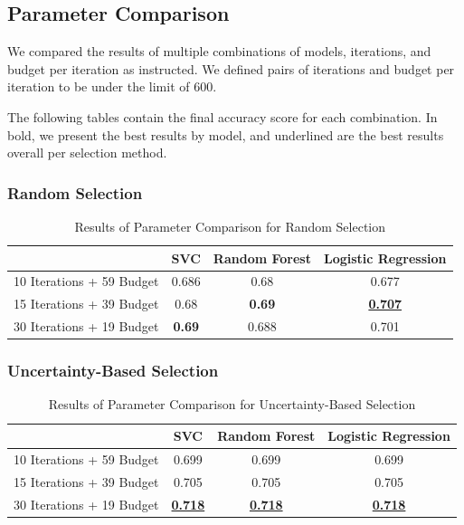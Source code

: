 \documentclass[12pt]{article}
\begin{document}
\subsection{Parameter Comparison}

We compared the results of multiple combinations of models, iterations, and budget per iteration as instructed. We defined pairs of iterations and budget per iteration to be under the limit of 600.

The following tables contain the final accuracy score for each combination. In bold, we present the best results by model, and underlined are the best results overall per selection method.

\subsubsection*{Random Selection}

\begin{table}[H]
    \centering
    \begin{tabular}{|c|c|c|c|}
        \hline
        & SVC & Random Forest & Logistic Regression \\
        \hline
        10 Iterations + 59 Budget & 0.686 & 0.68 & 0.677 \\
        15 Iterations + 39 Budget & 0.68 & \textbf{0.69} & \underline{\textbf{0.707}} \\
        30 Iterations + 19 Budget & \textbf{0.69} & 0.688 & 0.701 \\
        \hline
    \end{tabular}
    \caption{Results of Parameter Comparison for Random Selection}
\end{table}

\subsubsection*{Uncertainty-Based Selection}

\begin{table}[H]
    \centering
    \begin{tabular}{|c|c|c|c|}
        \hline
        & SVC & Random Forest & Logistic Regression \\
        \hline
        10 Iterations + 59 Budget & 0.699 & 0.699 & 0.699 \\
        15 Iterations + 39 Budget & 0.705 & 0.705 & 0.705 \\
        30 Iterations + 19 Budget & \underline{\textbf{0.718}} & \underline{\textbf{0.718}} & \underline{\textbf{0.718}} \\
        \hline
    \end{tabular}
    \caption{Results of Parameter Comparison for Uncertainty-Based Selection}
\end{table}
\end{document}
